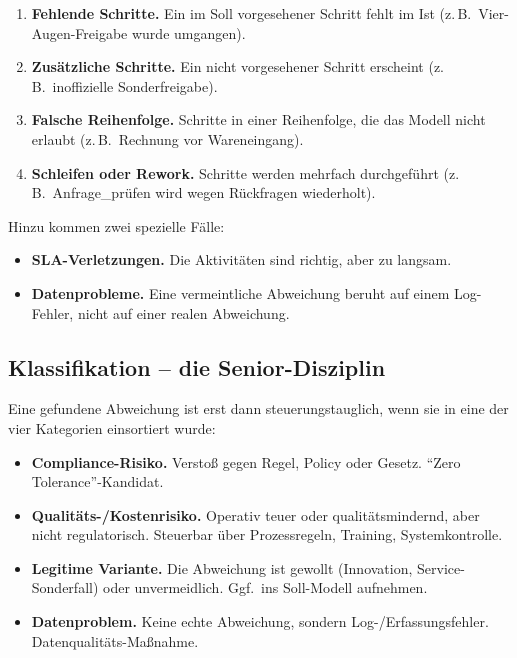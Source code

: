 \documentclass[11pt,a4paper,oneside]{article}
\newcommand{\fachbegriff}[1]{\textbf{#1}}
\begin{document}
\begin{enumerate}
  \item \fachbegriff{Fehlende Schritte.} Ein im Soll vorgesehener Schritt fehlt im Ist (z.\,B.\ Vier-Augen-Freigabe wurde umgangen).
  \item \fachbegriff{Zusätzliche Schritte.} Ein nicht vorgesehener Schritt erscheint (z.\,B.\ inoffizielle Sonderfreigabe).
  \item \fachbegriff{Falsche Reihenfolge.} Schritte in einer Reihenfolge, die das Modell nicht erlaubt (z.\,B.\ Rechnung vor Wareneingang).
  \item \fachbegriff{Schleifen oder Rework.} Schritte werden mehrfach durchgeführt (z.\,B.\ Anfrage\_prüfen wird wegen Rückfragen wiederholt).
\end{enumerate}

Hinzu kommen zwei spezielle Fälle:

\begin{itemize}
  \item \fachbegriff{SLA-Verletzungen.} Die Aktivitäten sind richtig, aber zu langsam.
  \item \fachbegriff{Datenprobleme.} Eine vermeintliche Abweichung beruht auf einem Log-Fehler, nicht auf einer realen Abweichung.
\end{itemize}

\subsection{Klassifikation -- die Senior-Disziplin}

Eine gefundene Abweichung ist erst dann steuerungstauglich, wenn sie in eine der vier Kategorien einsortiert wurde:

\begin{itemize}
  \item \fachbegriff{Compliance-Risiko.} Verstoß gegen Regel, Policy oder Gesetz. ``Zero Tolerance''-Kandidat.
  \item \fachbegriff{Qualitäts-/Kostenrisiko.} Operativ teuer oder qualitätsmindernd, aber nicht regulatorisch. Steuerbar über Prozessregeln, Training, Systemkontrolle.
  \item \fachbegriff{Legitime Variante.} Die Abweichung ist gewollt (Innovation, Service-Sonderfall) oder unvermeidlich. Ggf.\ ins Soll-Modell aufnehmen.
  \item \fachbegriff{Datenproblem.} Keine echte Abweichung, sondern Log-/Erfassungsfehler. Datenqualitäts-Maßnahme.
\end{itemize}
\end{document}
